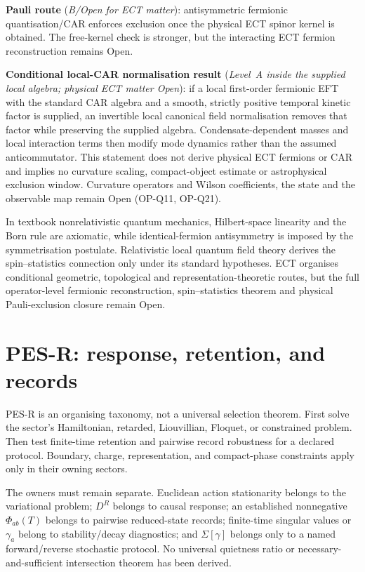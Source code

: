 \documentclass[11pt,a4paper]{article}
\begin{document}
\textbf{Pauli route} (\emph{B/Open for ECT matter}): antisymmetric fermionic quantisation/CAR enforces exclusion once the physical ECT spinor kernel is obtained. The free-kernel check is stronger, but the interacting ECT fermion reconstruction remains Open.

\textbf{Conditional local-CAR normalisation result} (\emph{Level~A inside
the supplied local algebra; physical ECT matter Open}): if a local
first-order fermionic EFT with the standard CAR algebra and a smooth,
strictly positive temporal kinetic factor is supplied, an invertible local
canonical field normalisation removes that factor while preserving the
supplied algebra.
Condensate-dependent masses and local interaction terms then modify mode
dynamics rather than the assumed anticommutator.  This statement does not
derive physical ECT fermions or CAR and implies no curvature scaling,
compact-object estimate or astrophysical exclusion window.  Curvature
operators and Wilson coefficients, the state and the observable map remain
Open (OP-Q11, OP-Q21).

In textbook nonrelativistic quantum mechanics, Hilbert-space linearity and the
Born rule are axiomatic, while identical-fermion antisymmetry is imposed by
the symmetrisation postulate.  Relativistic local quantum field theory derives
the spin--statistics connection only under its standard hypotheses.  ECT
organises conditional geometric, topological and representation-theoretic
routes, but the full operator-level fermionic reconstruction,
spin--statistics theorem and physical Pauli-exclusion closure remain Open.



\section{PES-R: response, retention, and records}
\label{sec:pop_pes}

PES-R is an organising taxonomy, not a universal selection theorem.
First solve the sector's Hamiltonian, retarded, Liouvillian, Floquet, or
constrained problem.  Then test finite-time retention and pairwise record
robustness for a declared protocol.  Boundary, charge, representation, and
compact-phase constraints apply only in their owning sectors.

The owners must remain separate.  Euclidean action stationarity belongs to
the variational problem; $D^R$ belongs to causal response; an established
nonnegative $\Phi_{ab}(T)$ belongs to pairwise reduced-state records;
finite-time singular values or
$\gamma_a$ belong to stability/decay diagnostics; and $\Sigma[\gamma]$
belongs only to a named forward/reverse stochastic protocol.  No universal
quietness ratio or necessary-and-sufficient intersection theorem has been
derived.
\end{document}
